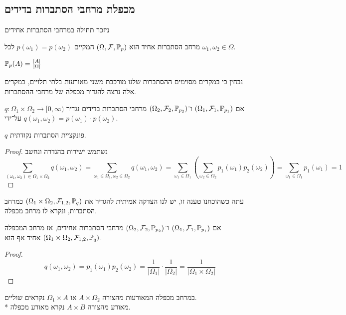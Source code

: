 \subsection{מכפלת מרחבי הסתברות בדידים}
ניזכר תחילה במרחבי הסתברות אחידים
\begin{definition}
	מרחב הסתברות אחיד הוא $(\Omega, \mathcal{F}, \mathbb{P}_p)$ המקיים $p(\omega_1) = p(\omega_2)$ לכל $\omega_1, \omega_2 \in \Omega$.
\end{definition}
\begin{conclusion}
	$\mathbb{P}_p(A) = \frac{|A|}{|\Omega|}$
\end{conclusion}
נבחין כי במקרים מסוימים ההסתברות שלנו מורכבת משני מאורעות בלתי תלויים, במקרים אלה נרצה להגדיר מכפלה של מרחבי ההסתברות.
\begin{definition}
	אם $(\Omega_1, \mathcal{F}_1, \mathbb{P}_{p_1})$ ו־$(\Omega_2, \mathcal{F}_2, \mathbb{P}_{p_2})$ מרחבי הסתברות בדידים
	נגדיר $q : \Omega_1 \times \Omega_2 \to [0, \infty)$ על־ידי $q(\omega_1, \omega_2) = p(\omega_1) \cdot p(\omega_2)$.
\end{definition}
\begin{proposition}
	$q$ פונקציית הסתברות נקודתית.
\end{proposition}
\begin{proof}
	נשתמש ישירות בהגדרה ונחשב
	\[
		\sum_{(\omega_1, \omega_2) \in \Omega_1 \times \Omega_2} q(\omega_1, \omega_2)
		= \sum_{\omega_1 \in \Omega_1, \omega_2 \in \Omega_2} q(\omega_1, \omega_2)
		= \sum_{\omega_1 \in \Omega_1} \left( \sum_{\omega_2 \in \Omega_2} p_1(\omega_1) p_2(\omega_2) \right)
		= \sum_{\omega_1 \in \Omega_1} p_1(\omega_1)
		= 1
	\]
\end{proof}
עתה כשהוכחנו טענה זו, יש לנו הצדקה אמיתית להגדיר את $(\Omega_1 \times \Omega_2, \mathcal{F}_{1,2}, \mathbb{P}_q)$ כמרחב הסתברות, ונקרא לו מרחב מכפלה.
\begin{proposition}
	אם $(\Omega_1, \mathcal{F}_1, \mathbb{P}_{p_1})$ ו־$(\Omega_2, \mathcal{F}_2, \mathbb{P}_{p_2})$ מרחבי הסתברות אחידים,
	אז מרחב המכפלה $(\Omega_1 \times \Omega_2, \mathcal{F}_{1,2}, \mathbb{P}_q)$ אחיד אף הוא.
\end{proposition}
\begin{proof}
	\[
		q(\omega_1, \omega_2) = p_1(\omega_1) p_2(\omega_2)
		= \frac{1}{|\Omega_1|} \cdot \frac{1}{|\Omega_2|}
		= \frac{1}{|\Omega_1 \times \Omega_2|}
	\]
\end{proof}
\begin{definition}
	במרחב מכפלה המאורעות מהצורה $A \times \Omega_2$ או $\Omega_1 \times A$ נקראים שוליים. \\*
	מאורע מהצורה $A \times B$ נקרא מאורע מכפלה.
\end{definition}
